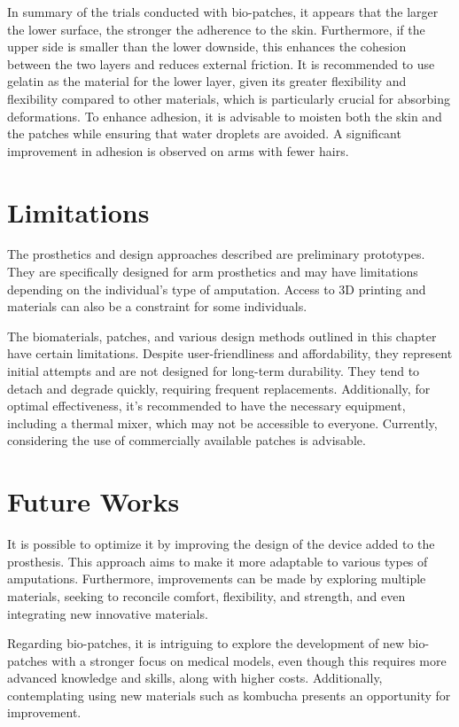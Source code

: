 In summary of the trials conducted with bio-patches, it appears that the larger the lower surface, the stronger the adherence to the skin. Furthermore, if the upper side is smaller than the lower downside, this enhances the cohesion between the two layers and reduces external friction. It is recommended to use gelatin as the material for the lower layer, given its greater flexibility and flexibility compared to other materials, which is particularly crucial for absorbing deformations. To enhance adhesion, it is advisable to moisten both the skin and the patches while ensuring that water droplets are avoided. A significant improvement in adhesion is observed on arms with fewer hairs.

\section{Limitations}
 The prosthetics and design approaches described are preliminary prototypes. They are specifically designed for arm prosthetics and may have limitations depending on the individual's type of amputation. Access to 3D printing and materials can also be a constraint for some individuals.

The biomaterials, patches, and various design methods outlined in this chapter have certain limitations. Despite user-friendliness and affordability, they represent initial attempts and are not designed for long-term durability. They tend to detach and degrade quickly, requiring frequent replacements. Additionally, for optimal effectiveness, it's recommended to have the necessary equipment, including a thermal mixer, which may not be accessible to everyone. Currently, considering the use of commercially available patches is advisable.

\section{Future Works}
It is possible to optimize it by improving the design of the device added to the prosthesis. This approach aims to make it more adaptable to various types of amputations. Furthermore, improvements can be made by exploring multiple materials, seeking to reconcile comfort, flexibility, and strength, and even integrating new innovative materials.

Regarding bio-patches, it is intriguing to explore the development of new bio-patches with a stronger focus on medical models, even though this requires more advanced knowledge and skills, along with higher costs. Additionally, contemplating using new materials such as kombucha presents an opportunity for improvement.

